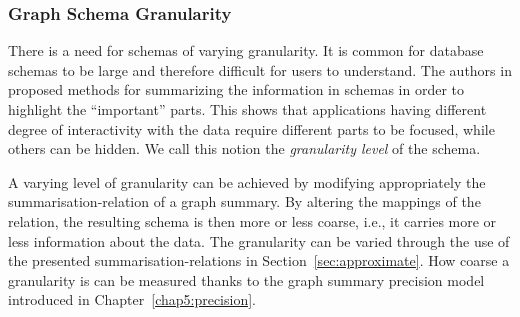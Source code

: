 \subsubsection{Graph Schema Granularity}

There is a need for schemas of varying granularity. It is common for database schemas to be large and therefore difficult for users to understand. The authors in \cite{yu:2006:schema-summarization,yang:2011:summary-graphs} proposed methods for summarizing the information in schemas in order to highlight the ``important'' parts. This shows that applications having different degree of interactivity with the data require different parts to be focused, while others can be hidden. We call this notion the \emph{granularity level} of the schema.

A varying level of granularity can be achieved by modifying appropriately the \gls{summarisation-relation} of a graph summary. By altering the mappings of the relation, the resulting schema is then more or less coarse, i.e., it carries more or less information about the data. The granularity can be varied through the use of the presented \glspl{summarisation-relation} in Section~\ref{sec:approximate}. How coarse a granularity is can be measured thanks to the graph summary precision model introduced in Chapter~\ref{chap5:precision}.

